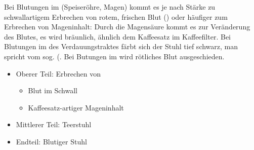 {
Bei Blutungen im 
(Speiseröhre, Magen) kommt es je nach Stärke zu
schwallartigem Erbrechen  von rotem, frischen Blut
() oder häufiger zum Erbrechen von
Mageninhalt: Durch die Magensäure kommt es zur Veränderung
des Blutes, es wird bräunlich, ähnlich dem Kaffeesatz im
Kaffeefilter. Bei Blutungen im  des
Verdauungstraktes färbt sich der Stuhl tief schwarz, man
spricht vom sog.  (. Bei Butungen im
 wird rötliches Blut ausgeschieden. 

}{
\begin{itemize}
  \item Oberer Teil: Erbrechen von
  \begin{itemize}
    \item Blut im Schwall
    \item Kaffeesatz-artiger Mageninhalt
  \end{itemize} 
  \item Mittlerer Teil: Teerstuhl
  \item Endteil: Blutiger Stuhl
\end{itemize}
}{}{}{}



% 
% 







